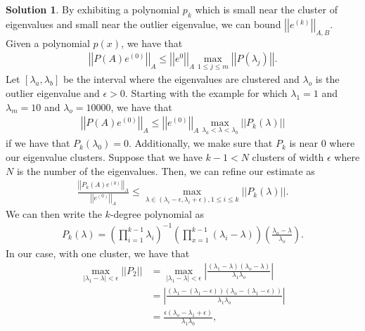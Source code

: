 \documentclass[12pt]{article}
\newcommand{\abs}[1]{ \left| #1 \right| }
\newcommand{\norm}[1]{ \left|\left| #1 \right|\right| }
\theoremstyle{definition}
\newtheorem{sol}{Solution}
\theoremstyle{remark}
\begin{document}
\begin{sol}
    By exhibiting a polynomial $p_{k}$ which is small near the cluster of eigenvalues and small near the outlier eigenvalue, we can bound $\norm{e^{(k)}}_{A, B}$. Given a polynomial $p(x)$, we have that
    \begin{align*}
        \norm{P(A) e^{(0)}}_{A} \leq \norm{e^{0}}_{A} \max_{1\leq j\leq m} \norm{P(\lambda_{j})}.
    \end{align*}
Let $[\lambda_{a}, \lambda_{b}]$ be the interval where the eigenvalues are clustered and $\lambda_{o}$ is the outlier eigenvalue and $\epsilon>0$. Starting with the example for which $\lambda_{1} = 1$ and $\lambda_{m} = 10$ and $\lambda_{o} = 10000$, we have that
\begin{align*}
    \norm{P(A) e^{(0)}}_{A} \leq \norm{ e^{(0)} }_{A} \max_{\lambda_{a} < \lambda < \lambda_{b}} \norm{P_{k}(\lambda)} 
\end{align*}
if we have that $P_{k}(\lambda_{0}) = 0$. Additionally, we make sure that $P_{k}$ is near 0 where our eigenvalue clusters. Suppose that we have $k - 1 < N$ clusters of width $\epsilon$ where $N$ is the number of the eigenvalues. Then, we can refine our estimate as 
\begin{align*}
    \frac{\norm{P_k(A) e^{(0)}}_{A}}{\norm{ e^{(0)} }_{A}}  \leq \max_{\lambda \in (\lambda_{i} - \epsilon, \lambda_{i} + \epsilon),1\leq i \leq k} \norm{P_{k}(\lambda)}. 
\end{align*}
We can then write the $k$-degree polynomial as
\begin{align*}
    P_{k}(\lambda) = \left(\prod_{i=1}^{k-1} \lambda_{i}\right)^{-1} \left( \prod_{x=1}^{k-1} (\lambda_{i} - \lambda)\right) \left(\frac{\lambda_{o} - \lambda}{\lambda_{o}}\right).
\end{align*}
In our case, with one cluster, we have that
\begin{align*}
    \max_{\abs{\lambda_{1} - \lambda} < \epsilon} \norm{P_{2}} &= \max_{\abs{\lambda_{1} - \lambda} < \epsilon}  \abs{\frac{(\lambda_{1} - \lambda)(\lambda_{o} - \lambda)}{\lambda_{1} \lambda_{o}} }\\
                                                               &= \abs{ \frac{(\lambda_{1} - (\lambda_{1} - \epsilon)) (\lambda_{o} - (\lambda_{1} - \epsilon)) }{\lambda_{1}\lambda_{o}}}\\
                                                               &= \frac{\epsilon (\lambda_{o} - \lambda_{1} + \epsilon)}{\lambda_{1}\lambda_{0}},
\end{align*}

\end{sol}
\end{document}
